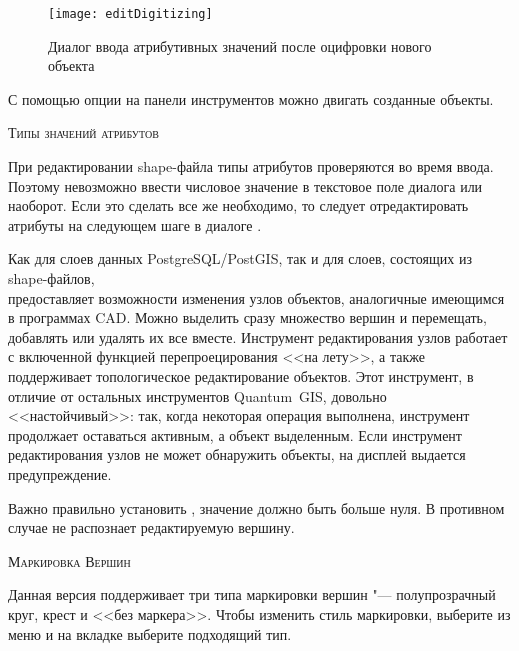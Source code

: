 \begin{figure}[ht]
   \centering
   \texttt{[image: editDigitizing]}
   \caption{Диалог ввода атрибутивных значений после оцифровки нового объекта \wincaption}\label{fig:vector_digitising}
 \end{figure}

С помощью опции  на
панели инструментов можно двигать созданные объекты.

\begin{Tip}\caption{\textsc{Типы значений атрибутов}}
При редактировании shape-файла типы атрибутов проверяются во время ввода.
Поэтому невозможно ввести числовое значение в текстовое поле диалога
 или наоборот. Если это сделать все же необходимо,
то следует отредактировать атрибуты на следующем шаге в диалоге
.
\end{Tip}


Как для слоев данных PostgreSQL/PostGIS, так и для слоев, состоящих из
shape-файлов, \\
 предоставляет
возможности изменения узлов объектов, аналогичные имеющимся в программах CAD.
Можно выделить сразу множество вершин и перемещать, добавлять или удалять
их все вместе. Инструмент редактирования узлов работает с включенной функцией
перепроецирования <<на лету>>, а также поддерживает топологическое редактирование
объектов. Этот инструмент, в отличие от остальных инструментов Quantum~GIS,
довольно <<настойчивый>>: так, когда некоторая операция выполнена, инструмент
продолжает оставаться активным, а объект выделенным. Если инструмент
редактирования узлов не может обнаружить объекты, на дисплей выдается
предупреждение.

Важно правильно установить  \arrow
{} \arrow
{} \arrow {}, значение должно быть
больше нуля. В противном случае \qg не распознает редактируемую вершину.

\begin{Tip}\caption{\textsc{Маркировка Вершин}}
Данная версия \qg поддерживает три типа маркировки вершин "--- полупрозрачный
круг, крест и <<без маркера>>. Чтобы изменить стиль маркировки, выберите
 из меню 
и на вкладке  выберите подходящий тип.
\end{Tip}

